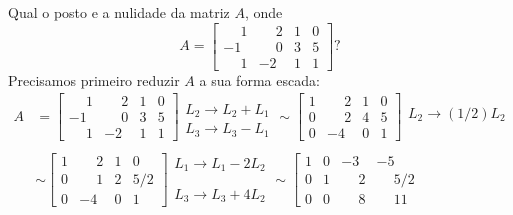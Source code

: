 \begin{exemplo}
	Qual o posto e a nulidade da matriz $A$, onde
	\[
		A =
		\begin{bmatrix}
			\phantom{-}1 & \phantom{-}2 & 1 & 0\\
			-1 & \phantom{-}0 & 3 & 5\\
			\phantom{-}1 & -2 & 1 & 1
		\end{bmatrix}?
	\]
	Precisamos primeiro reduzir $A$ a sua forma escada:
	\begin{align*}
		A &= 
			\left[
			\begin{array}{cccc}
				\phantom{-}1 & \phantom{-}2 & 1 & 0\\
				-1 & \phantom{-}0 & 3 & 5\\
				\phantom{-}1 & -2 & 1 & 1
			\end{array}
			\right]
			\begin{array}{l}
				\\
				L_2 \to L_2 + L_1\\
				L_3 \to L_3 - L_1
			\end{array} \sim
			\left[
				\begin{array}{cccc}
					1 & \phantom{-}2 & 1 & 0\\
					0 & \phantom{-}2 & 4 & 5\\
					0 & -4 & 0 & 1
				\end{array}
			\right]
			\begin{array}{l}
				\\
				L_2 \to (1/2)L_2\\
				\phantom{x}
			\end{array}\\ \\ &\sim
			\left[
				\begin{array}{cccc}
					1 & \phantom{-}2 & 1 & 0\\
					0 & \phantom{-}1 & 2 & 5/2\\
					0 & -4 & 0 & 1
				\end{array}
			\right]
			\begin{array}{l}
				L_1 \to L_1 - 2L_2\\
				\phantom{x}\\
				L_3 \to L_3 + 4L_2
			\end{array} \sim
			\left[
				\begin{array}{cccc}
					1 & 0 & -3 & -5\\
					0 & 1 & \phantom{-}2 & \phantom{-}5/2\\
					0 & 0 & \phantom{-}8 & \phantom{-}11
				\end{array}

\end{align*}
\end{exemplo}
